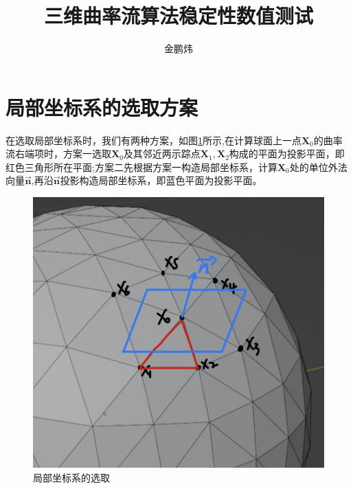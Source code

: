 \documentclass[11pt]{article}
\begin{document}

 \theoremstyle{definition}%
 \newtheorem{thm}{{定理}}
 \newtheorem{lem}[thm]{{引理}}
 \newtheorem{defn}[thm]{{定义}}
\newtheorem{prop}[thm]{{性质}}
 \newtheorem{cor}[thm]{{推论}}
 \newtheorem{nota}[thm]{{记号}}
 \newtheorem{exm}{{例}}
 \newtheorem{rem}[exm]{{注}}
 \newtheorem*{pro}{证明}

\title{三维曲率流算法稳定性数值测试}
\author{金鹏炜}
\date{}
\maketitle

\section{局部坐标系的选取方案}
\indent
在选取局部坐标系时，我们有两种方案，如图\ref{fig:局部坐标系的选取}所示,在计算球面上一点$\bm{X}_0$的曲率流右端项时，方案一选取$\bm{X}_0$及其邻近两示踪点$\bm{X}_1,\bm{X}_2$构成的平面为投影平面，即红色三角形所在平面;方案二先根据方案一构造局部坐标系，计算$\bm{X}_0$处的单位外法向量$\vec{\bm{n}}$,再沿$\vec{\bm{n}}$投影构造局部坐标系，即蓝色平面为投影平面。
\begin{figure}[htbp]
\centering
\includegraphics[scale=0.2]{fig/局部坐标系选取.jpg}
\caption{局部坐标系的选取}
\label{fig:局部坐标系的选取}
\end{figure}
\end{document}
